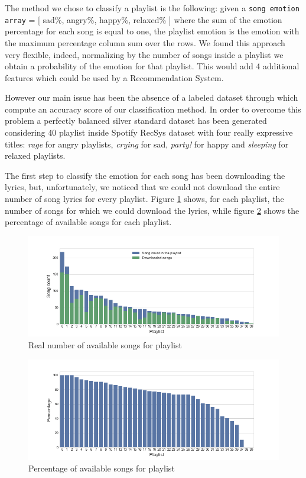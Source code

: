 The method we chose to classify a playlist is the following: given a \texttt{song emotion array} = [ sad\%, angry\%, happy\%, relaxed\% ] where the sum of the emotion percentage for each song is equal to one, the playlist emotion is the emotion with the maximum percentage column sum over the rows. We found this approach very flexible, indeed, normalizing by the number of songs inside a playlist we obtain a probability of the emotion for that playlist. This would add 4 additional features which could be used by a Recommendation System.

However our main issue has been the absence of a labeled dataset through which compute an accuracy score of our classification method. In order to overcome this problem a perfectly balanced silver standard dataset has been generated considering 40 playlist inside Spotify RecSys\cite{recsys} dataset with four really expressive titles: \textit{rage} for angry playlists, \textit{crying} for sad, \textit{party!} for happy and \textit{sleeping} for relaxed playlists. \par

The first step to classify the emotion for each song has been downloading the lyrics, but, unfortunately, we noticed that we could not download the entire number of song lyrics for every playlist. Figure \ref{fig:rsongs} shows, for each playlist, the number of songs for which we could download the lyrics, while figure \ref{fig:psongs} shows the percentage of available songs for each playlist. 

\begin{figure}[H]
\centering
\includegraphics[width=1\textwidth]{./chapters/chapter5/images/silver_standard_available_songs.png}
\caption{Real number of available songs for playlist}
\label{fig:rsongs}
\end{figure}

\begin{figure}[H]
\centering
\includegraphics[width=1\textwidth]{./chapters/chapter5/images/silver_standard_percentage_available_songs.png}
\caption{Percentage of available songs for playlist}
\label{fig:psongs}
\end{figure}

